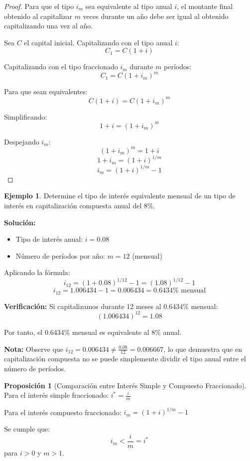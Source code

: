 \documentclass[12pt,a4paper]{article}
\theoremstyle{definition}
\newtheorem{proposicion}{Proposición}[section]
\newtheorem{ejemplo}{Ejemplo}[section]
\begin{document}
\begin{proof}
Para que el tipo $i_m$ sea equivalente al tipo anual $i$, el montante final obtenido al capitalizar $m$ veces durante un año debe ser igual al obtenido capitalizando una vez al año.

Sea $C$ el capital inicial. Capitalizando con el tipo anual $i$:
$$C_1 = C(1 + i)$$

Capitalizando con el tipo fraccionado $i_m$ durante $m$ períodos:
$$C_1 = C(1 + i_m)^m$$

Para que sean equivalentes:
$$C(1 + i) = C(1 + i_m)^m$$

Simplificando:
$$1 + i = (1 + i_m)^m$$

Despejando $i_m$:
$$(1 + i_m)^m = 1 + i$$
$$1 + i_m = (1 + i)^{1/m}$$
$$i_m = (1 + i)^{1/m} - 1$$
\end{proof}

\begin{ejemplo}
Determine el tipo de interés equivalente mensual de un tipo de interés en capitalización compuesta anual del 8\%.

\textbf{Solución:}
\begin{itemize}
\item Tipo de interés anual: $i = 0.08$
\item Número de períodos por año: $m = 12$ (mensual)
\end{itemize}

Aplicando la fórmula:
$$i_{12} = (1 + 0.08)^{1/12} - 1 = (1.08)^{1/12} - 1$$
$$i_{12} = 1.006434 - 1 = 0.006434 = 0.6434\%\text{ mensual}$$

\textbf{Verificación:}
Si capitalizamos durante 12 meses al 0.6434\% mensual:
$$(1.006434)^{12} = 1.08$$

Por tanto, el 0.6434\% mensual es equivalente al 8\% anual.

\textbf{Nota:} Observe que $i_{12} = 0.006434 \neq \frac{0.08}{12} = 0.006667$, lo que demuestra que en capitalización compuesta no se puede simplemente dividir el tipo anual entre el número de períodos.
\end{ejemplo}

\begin{proposicion}[Comparación entre Interés Simple y Compuesto Fraccionado]
Para el interés simple fraccionado: $i^* = \frac{i}{m}$

Para el interés compuesto fraccionado: $i_m = (1 + i)^{1/m} - 1$

Se cumple que:
\begin{equation}
i_m < \frac{i}{m} = i^*
\end{equation}
para $i > 0$ y $m > 1$.
\end{proposicion}
\end{document}
